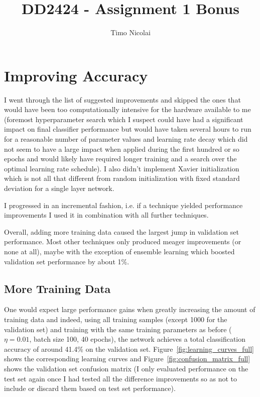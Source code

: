 \documentclass{article}
\begin{document}
\title{DD2424 - Assignment 1 Bonus}
\author{Timo Nicolai}

\maketitle

\section{Improving Accuracy}

I went through the list of suggested improvements and skipped the ones that
would have been too computationally intensive for the hardware available to me
(foremost hyperparameter search which I suspect could have had a significant
impact on final classifier performance but would have taken several hours to
run for a reasonable number of parameter values and learning rate decay which
did not seem to have a large impact when applied during the first hundred or so
epochs and would likely have required longer training and a search over the
optimal learning rate schedule). I also didn't implement Xavier initialization
which is not all that different from random initialization with fixed standard
deviation for a single layer network.

I progressed in an incremental fashion, i.e. if a technique yielded performance
improvements I used it in combination with all further techniques.

Overall, adding more training data caused the largest jump in validation set
performance. Most other techniques only produced meager improvements (or none
at all), maybe with the exception of ensemble learning which boosted validation
set performance by about 1\%.

\subsection{More Training Data}
One would expect large performance gains when greatly increasing the amount of
training data and indeed, using all training samples (except 1000 for the
validation set) and training with the same training parameters as before
($\eta = 0.01$, batch size 100, 40 epochs), the network achieves a total
classification accuracy of around 41.4\% on the validation set.
Figure~\ref{fig:learning_curves_full} shows the corresponding learning curves
and Figure~\ref{fig:confusion_matrix_full} shows the validation set confusion
matrix (I only evaluated performance on the test set again once I had tested
all the difference improvements so as not to include or discard them based
on test set performance).
\end{document}
